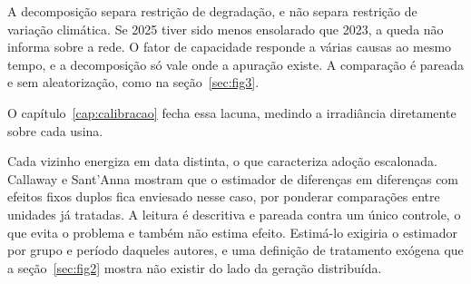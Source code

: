 \begin{objecao}
A decomposição separa restrição de degradação, e não separa restrição de
variação climática. Se 2025 tiver sido menos ensolarado que 2023, a queda não
informa sobre a rede. O fator de capacidade responde a várias causas ao mesmo
tempo, e a decomposição só vale onde a apuração existe. A comparação é pareada e
sem aleatorização, como na seção~\ref{sec:fig3}.
\end{objecao}

O capítulo~\ref{cap:calibracao} fecha essa lacuna, medindo a irradiância
diretamente sobre cada usina.

 Cada vizinho energiza
em data distinta, o que caracteriza adoção escalonada. Callaway e Sant'Anna
\cite{callaway2021} mostram que o estimador de diferenças em diferenças com
efeitos fixos duplos fica enviesado nesse caso, por ponderar comparações entre
unidades já tratadas. A leitura é descritiva e pareada contra um único
controle, o que evita o problema e também não estima efeito. Estimá-lo exigiria
o estimador por grupo e período daqueles autores, e uma definição de tratamento
exógena que a seção~\ref{sec:fig2} mostra não existir do lado da geração
distribuída.
